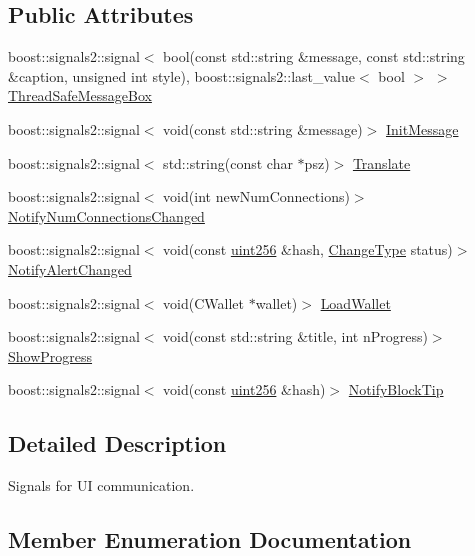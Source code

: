 \subsection*{Public Attributes}
\begin{DoxyCompactItemize}
\item 
boost\+::signals2\+::signal$<$ bool(const std\+::string \&message, const std\+::string \&caption, unsigned int style), boost\+::signals2\+::last\+\_\+value$<$ bool $>$ $>$ \hyperlink{class_c_client_u_i_interface_a9d328cc06777490e90e8c6a9cb31335f}{Thread\+Safe\+Message\+Box}
\item 
boost\+::signals2\+::signal$<$ void(const std\+::string \&message)$>$ \hyperlink{class_c_client_u_i_interface_abc63cc3f3e5e15632f713d859dbc6bc2}{Init\+Message}
\item 
boost\+::signals2\+::signal$<$ std\+::string(const char $\ast$psz)$>$ \hyperlink{class_c_client_u_i_interface_a996160f65965769cf7fc50e6fd17dc9a}{Translate}
\item 
boost\+::signals2\+::signal$<$ void(int new\+Num\+Connections)$>$ \hyperlink{class_c_client_u_i_interface_a496995d44db8dc3e3ef84d345e25967d}{Notify\+Num\+Connections\+Changed}
\item 
boost\+::signals2\+::signal$<$ void(const \hyperlink{classuint256}{uint256} \&hash, \hyperlink{ui__interface_8h_a293ba931937e469a6327b8d6b4872969}{Change\+Type} status)$>$ \hyperlink{class_c_client_u_i_interface_a2c42ebdda06512513445cd86881b157a}{Notify\+Alert\+Changed}
\item 
boost\+::signals2\+::signal$<$ void(C\+Wallet $\ast$wallet)$>$ \hyperlink{class_c_client_u_i_interface_a32a8930a5b69dd92e25fa474bd6e5420}{Load\+Wallet}
\item 
boost\+::signals2\+::signal$<$ void(const std\+::string \&title, int n\+Progress)$>$ \hyperlink{class_c_client_u_i_interface_a64e516e507dd74f3639c51dffa645af2}{Show\+Progress}
\item 
boost\+::signals2\+::signal$<$ void(const \hyperlink{classuint256}{uint256} \&hash)$>$ \hyperlink{class_c_client_u_i_interface_a4bfd5841b9471733b40568ca21eaf010}{Notify\+Block\+Tip}
\end{DoxyCompactItemize}


\subsection{Detailed Description}
Signals for U\+I communication. 

\subsection{Member Enumeration Documentation}
\hypertarget{class_c_client_u_i_interface_a568cf07ecac3fac224d63b42a32e8bc1}{}
